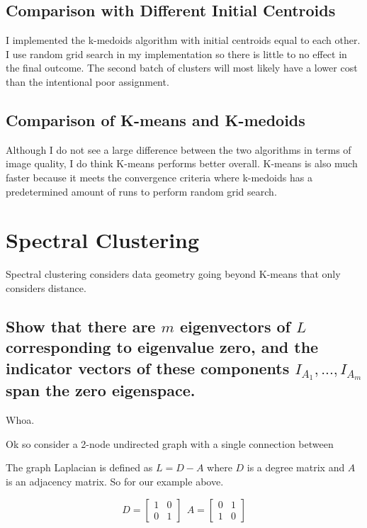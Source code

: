 \documentclass[a4paper]{article}
\begin{document}
\subsection{Comparison with Different Initial Centroids}
I implemented the k-medoids algorithm with initial centroids equal to each other.  I use random grid search in my implementation so there is little to no effect in the final outcome.  The second batch of clusters will most likely have a lower cost than the intentional poor assignment.
\subsection{Comparison of K-means and K-medoids}
Although I do not see a large difference between the two algorithms in terms of image quality, I do think K-means performs better overall.  K-means is also much faster because it meets the convergence criteria where k-medoids has a predetermined amount of runs to perform random grid search.

\section{Spectral Clustering}
Spectral clustering considers data geometry going beyond K-means that only considers distance.
\subsection{Show that there are $m$ eigenvectors of $L$ corresponding to eigenvalue zero, and the indicator vectors of these components $I_{A_1} , . . . , I_{A_m}$ span the zero eigenspace.}

Whoa.

Ok so consider a 2-node undirected graph with a single connection between

The graph Laplacian is defined as $L = D - A $ where $D$ is a degree matrix and $A$ is an adjacency matrix.  So for our example above. 

$$
D = 
\begin{bmatrix} 
1 & 0 \\
0 & 1 
\end{bmatrix}\ \
A = 
\begin{bmatrix} 
0 & 1 \\
1 & 0 
\end{bmatrix}
$$
\end{document}
